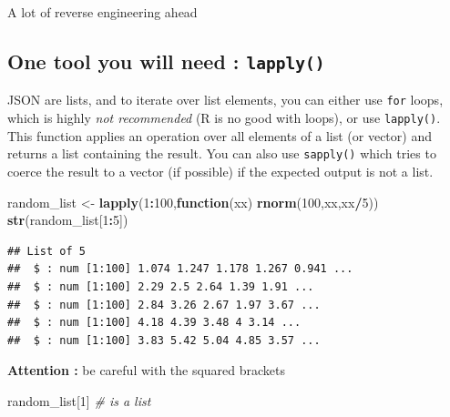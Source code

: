 \documentclass[
]{book}
\newenvironment{Shaded}{\begin{snugshade}}{\end{snugshade}}
\newcommand{\CommentTok}[1]{\textcolor[rgb]{0.56,0.35,0.01}{\textit{#1}}}
\newcommand{\ControlFlowTok}[1]{\textcolor[rgb]{0.13,0.29,0.53}{\textbf{#1}}}
\newcommand{\DecValTok}[1]{\textcolor[rgb]{0.00,0.00,0.81}{#1}}
\newcommand{\KeywordTok}[1]{\textcolor[rgb]{0.13,0.29,0.53}{\textbf{#1}}}
\newcommand{\NormalTok}[1]{#1}
\newcommand{\OperatorTok}[1]{\textcolor[rgb]{0.81,0.36,0.00}{\textbf{#1}}}
\newcommand{\StringTok}[1]{\textcolor[rgb]{0.31,0.60,0.02}{#1}}
\begin{document}
A lot of reverse engineering ahead

\hypertarget{one-tool-you-will-need-lapply}{%
\subsection{\texorpdfstring{One tool you will need : \texttt{lapply()}}{One tool you will need : lapply()}}\label{one-tool-you-will-need-lapply}}

JSON are lists, and to iterate over list elements, you can either use \texttt{for} loops, which is highly \emph{not recommended} (R is no good with loops), or use \texttt{lapply()}. This function applies an operation over all elements of a list (or vector) and returns a list containing the result. You can also use \texttt{sapply()} which tries to coerce the result to a vector (if possible) if the expected output is not a list.

\begin{Shaded}
\begin{Highlighting}[]
\NormalTok{random_list <-}\StringTok{ }\KeywordTok{lapply}\NormalTok{(}\DecValTok{1}\OperatorTok{:}\DecValTok{100}\NormalTok{,}\ControlFlowTok{function}\NormalTok{(xx) }\KeywordTok{rnorm}\NormalTok{(}\DecValTok{100}\NormalTok{,xx,xx}\OperatorTok{/}\DecValTok{5}\NormalTok{))}
\KeywordTok{str}\NormalTok{(random_list[}\DecValTok{1}\OperatorTok{:}\DecValTok{5}\NormalTok{])}
\end{Highlighting}
\end{Shaded}

\begin{verbatim}
## List of 5
##  $ : num [1:100] 1.074 1.247 1.178 1.267 0.941 ...
##  $ : num [1:100] 2.29 2.5 2.64 1.39 1.91 ...
##  $ : num [1:100] 2.84 3.26 2.67 1.97 3.67 ...
##  $ : num [1:100] 4.18 4.39 3.48 4 3.14 ...
##  $ : num [1:100] 3.83 5.42 5.04 4.85 3.57 ...
\end{verbatim}

\textbf{Attention :} be careful with the squared brackets

\begin{Shaded}
\begin{Highlighting}[]
\NormalTok{random_list[}\DecValTok{1}\NormalTok{] }\CommentTok{# is a list}
\end{Highlighting}
\end{Shaded}
\end{document}
